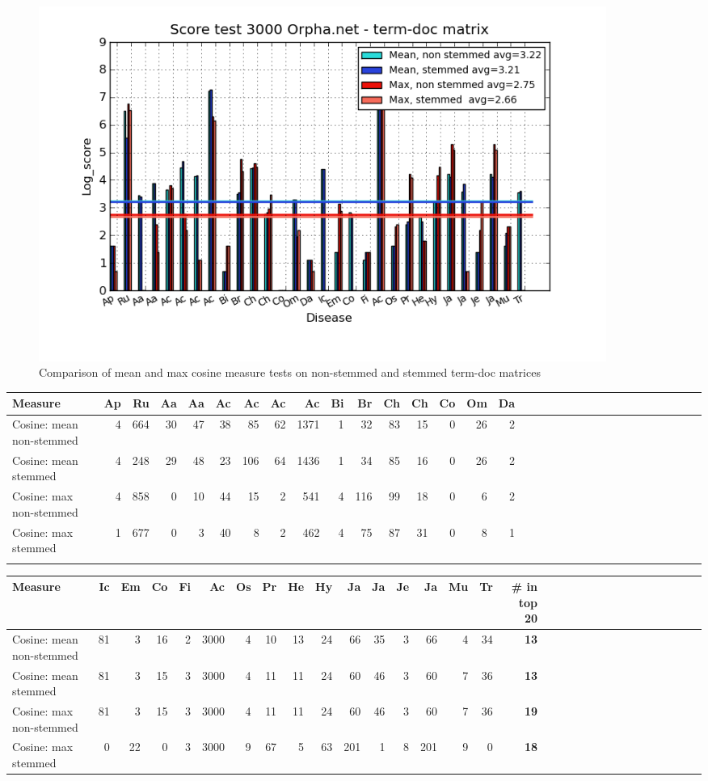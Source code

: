 \begin{figure}[H]
        \begin{center}
          \includegraphics[width=0.9\textwidth]{barcharts/termDoc_orphan_hist_3000_ns_mea_s_mea_ns_max_s_max.png}
        \end{center}
        \caption{Comparison of mean and max cosine measure tests on non-stemmed and stemmed term-doc matrices}
        \label{termDoc_orphan_hist_3000_ns_mea_s_mea_ns_max_s_max}
\end{figure}

\begin{table}[H]
\begin{tiny}
  \begin{tabular}{|l|r|r|r|r|r|r|r|r|r|r|r|r|r|r|r|r|r|r|r|r|r|r|r|r|r|r|r|r|r|r|r|}
    \hline
    Measure &Ap&Ru&Aa&Aa&Ac&Ac&Ac&Ac&Bi&Br&Ch&Ch&Co&Om&Da\\
    \hline
    Cosine: mean non-stemmed &4&664&30&47&38&85&62&1371&1&32&83&15&0&26&2\\
    \hline
    Cosine: mean stemmed &4&248&29&48&23&106&64&1436&1&34&85&16&0&26&2\\
    \hline
    Cosine: max non-stemmed &4&858&0&10&44&15&2&541&4&116&99&18&0&6&2\\
    \hline
    Cosine: max stemmed &1&677&0&3&40&8&2&462&4&75&87&31&0&8&1 \\
    \hline
    \multicolumn{16}{c}{} \\
    \end{tabular}
    \begin{tabular}{|l|r|r|r|r|r|r|r|r|r|r|r|r|r|r|r|r|r|r|r|r|r|r|r|r|r|r|r|r|r|r|}
    \hline
     Measure &Ic&Em&Co&Fi&Ac&Os&Pr&He&Hy&Ja&Ja&Je&Ja&Mu&Tr &\scriptsize{\textbf{\# in top 20}} \\
    \hline
    Cosine: mean non-stemmed  &81&3&16&2&3000&4&10&13&24&66&35&3&66&4&34 & \scriptsize{\textbf{13}} \\
    \hline
    Cosine: mean stemmed &81&3&15&3&3000&4&11&11&24&60&46&3&60&7&36 & \scriptsize{\textbf{13}} \\
    \hline
    Cosine: max non-stemmed &81&3&15&3&3000&4&11&11&24&60&46&3&60&7&36 & \scriptsize{\textbf{19}} \\
    \hline
    Cosine: max stemmed &0&22&0&3&3000&9&67&5&63&201&1&8&201&9&0 & \scriptsize{\textbf{18}} \\
    \hline
  \end{tabular}
\end{tiny}
\end{table}

